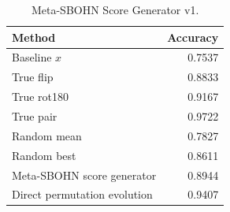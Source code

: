 \begin{table}[h]
\centering
\caption{Meta-SBOHN Score Generator v1.}
\begin{tabular}{l r}
\hline
Method & Accuracy \\
\hline
Baseline \(x\) & 0.7537 \\
True flip & 0.8833 \\
True rot180 & 0.9167 \\
True pair & 0.9722 \\
Random mean & 0.7827 \\
Random best & 0.8611 \\
Meta-SBOHN score generator & 0.8944 \\
Direct permutation evolution & 0.9407 \\
\hline
\end{tabular}
\end{table}
